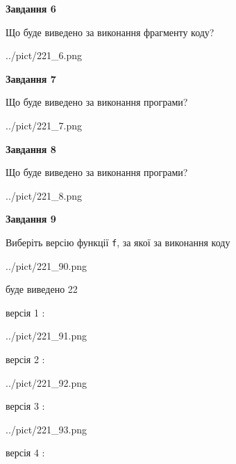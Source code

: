 \documentclass[12pt, ukrainian]{article}
\def\code#1{\Verb!#1!}
\begin{document}
{\begin {large}
{\begin {center}\textbf{Завдання 6}\end {center}}

Що буде виведено за виконання фрагменту коду?\par
\begin{center}
	{../pict/221_6.png}
\end{center}
\newpage

{\begin {center}\textbf{Завдання 7}\end {center}}

Що буде виведено за виконання програми?\par
\begin{center}
	{../pict/221_7.png}
\end{center}
\newpage

{\begin {center}\textbf{Завдання 8}\end {center}}

Що буде виведено за виконання програми?\par
\begin{center}
	{../pict/221_8.png}
\end{center}
\newpage

{\begin {center}\textbf{Завдання 9}\end {center}}

Виберіть версію функції \code{f}, за якої за виконання коду
\begin{center}
	{../pict/221_90.png}
\end{center}
буде виведено 22

\vspace{5mm}
версія 1 :

\begin{center}
	{../pict/221_91.png}
\end{center}
версія 2 :

\begin{center}
	{../pict/221_92.png}
\end{center}
версія 3 :

\begin{center}
	{../pict/221_93.png}
\end{center}
версія 4 :


\end{large}}
\end{document}
